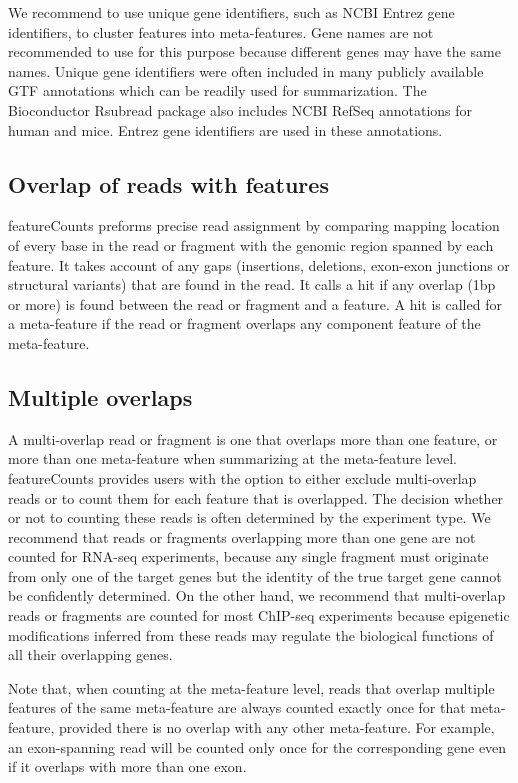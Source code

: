 \documentclass[12pt]{report}
\newcommand{\Rsubread}{\textsf{Rsubread}}
\newcommand{\featureCounts}{\textsf{featureCounts}}
\begin{document}
We recommend to use unique gene identifiers, such as NCBI Entrez gene identifiers, to cluster features into meta-features. Gene names are not recommended to use for this purpose because different genes may have the same names. Unique gene identifiers were often included in many publicly available GTF annotations which can be readily used for summarization. The Bioconductor {\Rsubread} package also includes NCBI RefSeq annotations for human and mice. Entrez gene identifiers are used in these annotations.

\subsection{Overlap of reads with features}

{\featureCounts} preforms precise read assignment by comparing mapping location of every base in the read or fragment with the genomic region spanned by each feature. It takes account of any gaps (insertions, deletions, exon-exon junctions or structural variants) that are found in the read. It calls a hit if any overlap (1bp or more) is found between the read or fragment and a feature.
A hit is called for a meta-feature if the read or fragment overlaps any component feature of the meta-feature.

\subsection{Multiple overlaps}

A multi-overlap read or fragment is one that overlaps more than one feature, or more than one meta-feature when summarizing at the meta-feature level. {\featureCounts} provides users with the option to either exclude multi-overlap reads or to count them for each feature that is overlapped. The decision whether or not to counting these reads is often determined by the experiment type. We recommend that reads or fragments overlapping more than one gene are not counted for RNA-seq experiments, because any single fragment must originate from only one of the target genes but the identity of the true target gene cannot be confidently determined. On the other hand, we recommend that multi-overlap reads or fragments are counted for most ChIP-seq experiments because epigenetic modifications inferred from these reads may regulate the biological functions of all their overlapping genes.

Note that, when counting at the meta-feature level, reads that overlap multiple features of the same meta-feature are always counted exactly once for that meta-feature, provided there is no overlap with any other meta-feature. For example, an exon-spanning read will be counted only once for the corresponding gene even if it overlaps with more than one exon.
\end{document}
